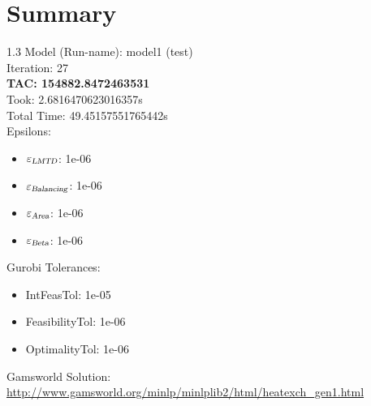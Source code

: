 \documentclass{article}%
\begin{document}
%
\normalsize%
\section{Summary}%
\thispagestyle{plain}%
\begin{spacing}{1.3}%
\Large%
Model (Run-name): model1 (test)\\%
Iteration: 27\\%
\textbf{TAC: 154882.8472463531}\\%
Took: 2.6816470623016357s\\%
Total Time: 49.45157551765442s\\%
Epsilons:%
\begin{itemize}%
	\item $\varepsilon_{\textsl{LMTD}}$: 1e-06%
	\item $\varepsilon_{\textsl{Balancing}}$: 1e-06%
	\item $\varepsilon_{\textsl{Area}}$: 1e-06%
	\item $\varepsilon_{\textsl{Beta}}$: 1e-06%
\end{itemize}%
Gurobi Tolerances:%
\begin{itemize}%
	\item IntFeasTol: 1e-05%
	\item FeasibilityTol: 1e-06%
	\item OptimalityTol: 1e-06%
\end{itemize}%
\end{spacing}%
\normalsize%
Gamsworld Solution: \url{http://www.gamsworld.org/minlp/minlplib2/html/heatexch_gen1.html}%
%
\clearpage%
\end{document}
